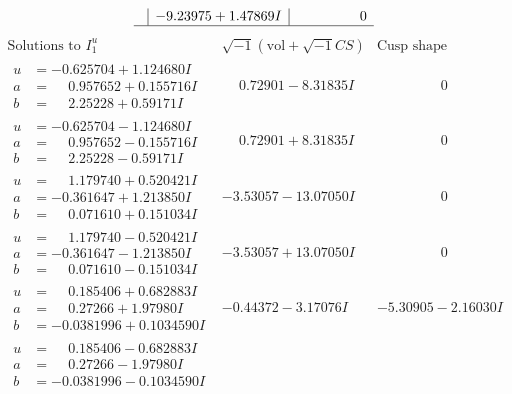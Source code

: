 \documentclass[1p]{elsarticle_modified}
\theoremstyle{definition}
\newcommand{\I}{\sqrt{-1}}
\begin{document}
$$\begin{array}{c|c|c}
 & -9.23975 + 1.47869 I & \phantom{-0.000000 } 0\\
 \hline 
 \end{array}$$\newpage$$\begin{array}{c|c|c}  
\text{Solutions to }I^u_{1}& \I (\text{vol} + \sqrt{-1}CS) & \text{Cusp shape}\\
 \hline 
\begin{aligned}
u &= -0.625704 + 1.124680 I \\
a &= \phantom{-}0.957652 + 0.155716 I \\
b &= \phantom{-}2.25228 + 0.59171 I\end{aligned}
 & \phantom{-}0.72901 - 8.31835 I & \phantom{-0.000000 } 0 \\ \hline\begin{aligned}
u &= -0.625704 - 1.124680 I \\
a &= \phantom{-}0.957652 - 0.155716 I \\
b &= \phantom{-}2.25228 - 0.59171 I\end{aligned}
 & \phantom{-}0.72901 + 8.31835 I & \phantom{-0.000000 } 0 \\ \hline\begin{aligned}
u &= \phantom{-}1.179740 + 0.520421 I \\
a &= -0.361647 + 1.213850 I \\
b &= \phantom{-}0.071610 + 0.151034 I\end{aligned}
 & -3.53057 - 13.07050 I & \phantom{-0.000000 } 0 \\ \hline\begin{aligned}
u &= \phantom{-}1.179740 - 0.520421 I \\
a &= -0.361647 - 1.213850 I \\
b &= \phantom{-}0.071610 - 0.151034 I\end{aligned}
 & -3.53057 + 13.07050 I & \phantom{-0.000000 } 0 \\ \hline\begin{aligned}
u &= \phantom{-}0.185406 + 0.682883 I \\
a &= \phantom{-}0.27266 + 1.97980 I \\
b &= -0.0381996 + 0.1034590 I\end{aligned}
 & -0.44372 - 3.17076 I & -5.30905 - 2.16030 I \\ \hline\begin{aligned}
u &= \phantom{-}0.185406 - 0.682883 I \\
a &= \phantom{-}0.27266 - 1.97980 I \\
b &= -0.0381996 - 0.1034590 I\end{aligned}

\end{array}$$
\end{document}
